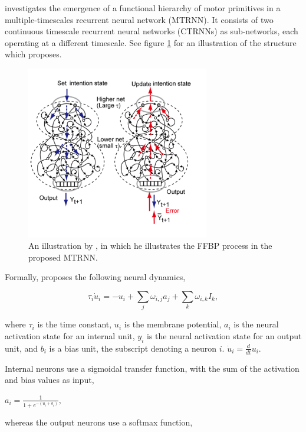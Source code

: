 \cite{Tani2014} investigates the emergence of a functional hierarchy of motor primitives in a multiple-timescales recurrent neural network (MTRNN). It consists of two continuous timescale recurrent neural networks (CTRNNs) as sub-networks, each operating at a different timescale. See figure \ref{fig:tani_2014_mtrnn} for an illustration of the structure which \cite{Tani2014} proposes.

\begin{figure}
\centering
\includegraphics[width=8cm]{fig/tani_2014_mtrnn}
\caption{An illustration by \cite{Tani2014}, in which he illustrates the FFBP process in the proposed MTRNN.}
\label{fig:tani_2014_mtrnn}
\end{figure}

Formally, \cite{Tani2014} proposes the following neural dynamics,

\begin{equation}\label{tani_membrane_potential}
    \tau_i\dot{u}_i = -u_i + \sum_{j}{}\omega_{i,j}a_j + \sum_{k}{}\omega_{i,k} I_k,
\end{equation}

where $\tau_i$ is the time constant, $u_i$ is the membrane potential, $a_i$ is the neural activation state for an internal unit, $y_i$ is the neural activation state for an output unit, and $b_i$ is a bias unit, the subscript denoting a neuron $i$. $\dot{u}_i = \frac{d}{d t}u_i$.

Internal neurons use a sigmoidal transfer function, with the sum of the activation and bias values as input, 

\begin{center}\begin{math}
    a_i = \frac{1}{1+e^{-(u_i+b_i)}},
\end{math}\end{center}
whereas the output neurons use a softmax function,

